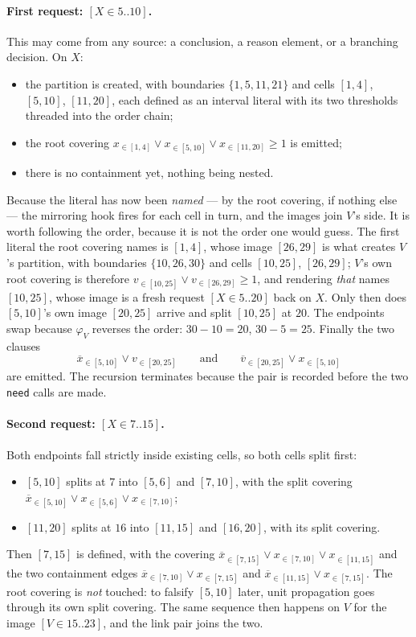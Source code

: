 \documentclass[11pt,a4paper]{article}
\theoremstyle{plain}
\theoremstyle{definition}
\theoremstyle{remark}
\newcommand{\atin}[3]{#1_{\in[#2,#3]}}
\newcommand{\natin}[3]{\overline{#1}_{\in[#2,#3]}}
\newcommand{\code}[1]{\texttt{#1}}
\begin{document}
\paragraph{First request: $[X\in 5..10]$.}
This may come from any source: a conclusion, a reason element, or a branching
decision.  On $X$:
\begin{itemize}[itemsep=0pt]
  \item the partition is created, with boundaries $\{1,5,11,21\}$ and cells
    $[1,4]$, $[5,10]$, $[11,20]$, each defined as an interval literal with its
    two thresholds threaded into the order chain;
  \item the root covering
    $\atin{x}{1}{4}\vee\atin{x}{5}{10}\vee\atin{x}{11}{20}\geq 1$ is emitted;
  \item there is no containment yet, nothing being nested.
\end{itemize}
Because the literal has now been \emph{named} --- by the root covering, if
nothing else --- the mirroring hook fires for each cell in turn, and the images
join $V$'s side.  It is worth following the order, because it is not the order
one would guess.  The first literal the root covering names is $[1,4]$, whose
image $[26,29]$ is what creates $V$'s partition, with boundaries
$\{10,26,30\}$ and cells $[10,25]$, $[26,29]$; $V$'s own root covering is
therefore $\atin{v}{10}{25}\vee\atin{v}{26}{29}\geq 1$, and rendering \emph{that}
names $[10,25]$, whose image is a fresh request $[X\in 5..20]$ back on $X$.  Only
then does $[5,10]$'s own image $[20,25]$ arrive and split $[10,25]$ at $20$.  The
endpoints swap because $\varphi_V$ reverses the order: $30-10=20$, $30-5=25$.
Finally the two clauses
\[
  \natin{x}{5}{10}\vee\atin{v}{20}{25}
  \qquad\text{and}\qquad
  \natin{v}{20}{25}\vee\atin{x}{5}{10}
\]
are emitted.  The recursion terminates because the pair is recorded before the
two \code{need} calls are made.

\paragraph{Second request: $[X\in 7..15]$.}
Both endpoints fall strictly inside existing cells, so both cells split first:
\begin{itemize}[itemsep=0pt]
  \item $[5,10]$ splits at $7$ into $[5,6]$ and $[7,10]$, with the split covering
    $\natin{x}{5}{10}\vee\atin{x}{5}{6}\vee\atin{x}{7}{10}$;
  \item $[11,20]$ splits at $16$ into $[11,15]$ and $[16,20]$, with its split
    covering.
\end{itemize}
Then $[7,15]$ is defined, with the covering
$\natin{x}{7}{15}\vee\atin{x}{7}{10}\vee\atin{x}{11}{15}$ and the two
containment edges $\natin{x}{7}{10}\vee\atin{x}{7}{15}$ and
$\natin{x}{11}{15}\vee\atin{x}{7}{15}$.  The root covering is
\emph{not} touched: to falsify $[5,10]$ later, unit propagation goes through its
own split covering.  The same sequence then happens on $V$ for the image
$[V\in 15..23]$, and the link pair joins the two.
\end{document}

